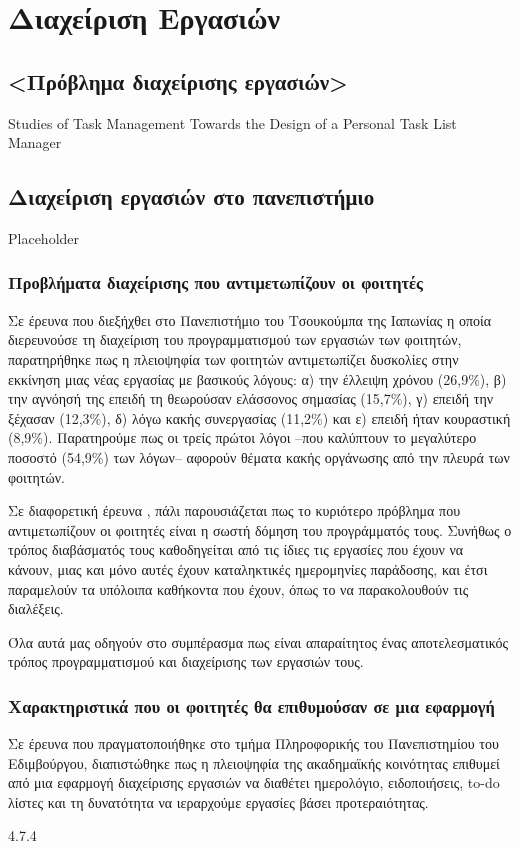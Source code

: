 \chapter{Διαχείριση Εργασιών}

    \section{<Πρόβλημα διαχείρισης εργασιών>}
        Studies of Task Management Towards the Design of a Personal Task List Manager

    \section{Διαχείριση εργασιών στο πανεπιστήμιο}
        Placeholder

        \subsection{Προβλήματα διαχείρισης που αντιμετωπίζουν οι φοιτητές}
            Σε έρευνα \cite{Fukuzawa2015} που διεξήχθει στο Πανεπιστήμιο του Τσουκούμπα της Ιαπωνίας η οποία διερευνούσε τη διαχείριση του προγραμματισμού των εργασιών των φοιτητών,
                παρατηρήθηκε πως η πλειοψηφία των φοιτητών αντιμετωπίζει δυσκολίες στην εκκίνηση μιας νέας εργασίας με βασικούς λόγους:
                α) την έλλειψη χρόνου (26,9\%), β) την αγνόησή της επειδή τη θεωρούσαν ελάσσονος σημασίας (15,7\%), γ) επειδή την ξέχασαν (12,3\%),
                δ) λόγω κακής συνεργασίας (11,2\%) και ε) επειδή ήταν κουραστική (8,9\%).
            Παρατηρούμε πως οι τρείς πρώτοι λόγοι --που καλύπτουν το μεγαλύτερο ποσοστό (54,9\%) των λόγων-- αφορούν θέματα κακής οργάνωσης από την πλευρά των φοιτητών.

            Σε διαφορετική έρευνα \cite{Trujillo2020}, πάλι παρουσιάζεται πως το κυριότερο πρόβλημα που αντιμετωπίζουν οι φοιτητές είναι η σωστή δόμηση του προγράμματός τους.
            Συνήθως ο τρόπος διαβάσματός τους καθοδηγείται από τις ίδιες τις εργασίες που έχουν να κάνουν, μιας και μόνο αυτές έχουν καταληκτικές ημερομηνίες παράδοσης,
                και έτσι παραμελούν τα υπόλοιπα καθήκοντα που έχουν, όπως το να παρακολουθούν τις διαλέξεις.

            Όλα αυτά μας οδηγούν στο συμπέρασμα πως είναι απαραίτητος ένας αποτελεσματικός τρόπος προγραμματισμού και διαχείρισης των εργασιών τους.

        \subsection{Χαρακτηριστικά που οι φοιτητές θα επιθυμούσαν σε μια εφαρμογή}
            Σε έρευνα \cite{Trujillo2020} που πραγματοποιήθηκε στο τμήμα Πληροφορικής του Πανεπιστημίου του Εδιμβούργου,
                διαπιστώθηκε πως η πλειοψηφία της ακαδημαϊκής κοινότητας επιθυμεί από μια εφαρμογή διαχείρισης εργασιών να διαθέτει ημερολόγιο, ειδοποιήσεις, to-do λίστες και
                τη δυνατότητα να ιεραρχούμε εργασίες βάσει προτεραιότητας.

            4.7.4

